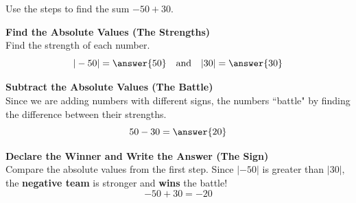 \documentclass{ximera}[font=12pt]
\begin{document}
\begin{example} 
    
    Use the steps to find the sum $-50 + 30.$

    \begin{explanation}
    \begin{description}[style=multiline, leftmargin=5em, font=\bfseries]
        \item[Step 1:] \textbf{Find the Absolute Values (The Strengths)} \\
        Find the strength of each number.
        \[ |-50| = \answer{50} \quad \text{and} \quad |30| = \answer{30} \]

        \item[Step 2:] \textbf{Subtract the Absolute Values (The Battle)} \\
        Since we are adding numbers with different signs, the numbers ``battle" by finding the difference between their strengths.
        \[ 50 - 30 = \answer{20} \]

        \item[Step 3:] \textbf{Declare the Winner and Write the Answer (The Sign)} \\
        Compare the absolute values from the first step. Since $|-50|$ is greater than $|30|,$ the \textbf{negative team}
        is stronger and \textbf{wins} the battle!  
        \[ -50 + 30 = -20 \]
\end{description}
\end{explanation}
\end{example}


\bigskip
\end{document}
